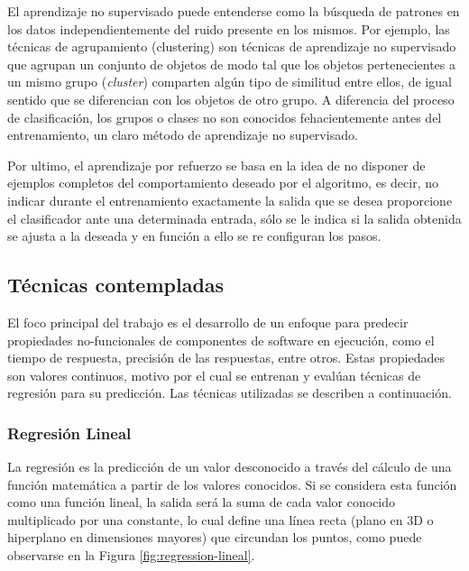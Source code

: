El aprendizaje no supervisado puede entenderse como la búsqueda de
patrones en los datos independientemente del ruido presente en los
mismos. Por ejemplo, las técnicas de agrupamiento (clustering) son
técnicas de aprendizaje no supervisado que agrupan un conjunto de
objetos de modo tal que los objetos pertenecientes a un mismo grupo
(\emph{cluster}) comparten algún tipo de similitud entre ellos, de
igual sentido que se diferencian con los objetos de otro grupo. A
diferencia del proceso de clasificación, los grupos o clases no son
conocidos fehacientemente antes del entrenamiento, un claro método
de aprendizaje no supervisado. 

Por ultimo, el aprendizaje por refuerzo se basa en la idea de no disponer
de ejemplos completos del comportamiento deseado por el algoritmo,
es decir, no indicar durante el entrenamiento exactamente la salida
que se desea proporcione el clasificador ante una determinada entrada,
sólo se le indica si la salida obtenida se ajusta a la deseada y en
función a ello se re configuran los pasos. 


\subsection{Técnicas contempladas\label{subsec:Funciones-contempladas}}

El foco principal del trabajo es el desarrollo de un enfoque para
predecir propiedades no-funcionales de componentes de software en
ejecución, como el tiempo de respuesta, precisión de las respuestas,
entre otros. Estas propiedades son valores continuos, motivo por el
cual se entrenan y evalúan técnicas de regresión para su predicción.
Las técnicas utilizadas se describen a continuación. 




\subsubsection{Regresión Lineal\label{sub:Regresi=0000F3n-Lineal}}

La regresión es la predicción de un valor desconocido a través del
cálculo de una función matemática a partir de los valores conocidos.
Si se considera esta función como una función lineal, la salida será
la suma de cada valor conocido multiplicado por una constante, lo
cual define una línea recta (plano en 3D o hiperplano en dimensiones
mayores) que circundan los puntos, como puede observarse en la Figura
\ref{fig:regression-lineal}. 

